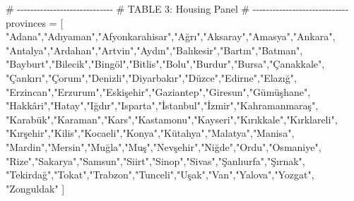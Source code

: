\documentclass[
  11pt,
  a4paper,
  DIV=11,
  numbers=noendperiod]{scrartcl}
\newenvironment{Shaded}{\begin{snugshade}}{\end{snugshade}}
\newcommand{\CommentTok}[1]{\textcolor[rgb]{0.37,0.37,0.37}{#1}}
\newcommand{\NormalTok}[1]{\textcolor[rgb]{0.00,0.23,0.31}{#1}}
\newcommand{\OperatorTok}[1]{\textcolor[rgb]{0.37,0.37,0.37}{#1}}
\newcommand{\StringTok}[1]{\textcolor[rgb]{0.13,0.47,0.30}{#1}}
\begin{document}
\begin{Shaded}
\begin{Highlighting}[]
\CommentTok{\# {-}{-}{-}{-}{-}{-}{-}{-}{-}{-}{-}{-}{-}{-}{-}{-}{-}{-}{-}{-}{-}{-}{-}{-}{-}{-}{-}{-}{-}}
\CommentTok{\# TABLE 3: Housing Panel}
\CommentTok{\# {-}{-}{-}{-}{-}{-}{-}{-}{-}{-}{-}{-}{-}{-}{-}{-}{-}{-}{-}{-}{-}{-}{-}{-}{-}{-}{-}{-}{-}}
\NormalTok{provinces }\OperatorTok{=}\NormalTok{ [}
    \StringTok{"Adana"}\NormalTok{,}\StringTok{"Adıyaman"}\NormalTok{,}\StringTok{"Afyonkarahisar"}\NormalTok{,}\StringTok{"Ağrı"}\NormalTok{,}\StringTok{"Aksaray"}\NormalTok{,}\StringTok{"Amasya"}\NormalTok{,}\StringTok{"Ankara"}\NormalTok{,}
    \StringTok{"Antalya"}\NormalTok{,}\StringTok{"Ardahan"}\NormalTok{,}\StringTok{"Artvin"}\NormalTok{,}\StringTok{"Aydın"}\NormalTok{,}\StringTok{"Balıkesir"}\NormalTok{,}\StringTok{"Bartın"}\NormalTok{,}\StringTok{"Batman"}\NormalTok{,}
    \StringTok{"Bayburt"}\NormalTok{,}\StringTok{"Bilecik"}\NormalTok{,}\StringTok{"Bingöl"}\NormalTok{,}\StringTok{"Bitlis"}\NormalTok{,}\StringTok{"Bolu"}\NormalTok{,}\StringTok{"Burdur"}\NormalTok{,}\StringTok{"Bursa"}\NormalTok{,}\StringTok{"Çanakkale"}\NormalTok{,}
    \StringTok{"Çankırı"}\NormalTok{,}\StringTok{"Çorum"}\NormalTok{,}\StringTok{"Denizli"}\NormalTok{,}\StringTok{"Diyarbakır"}\NormalTok{,}\StringTok{"Düzce"}\NormalTok{,}\StringTok{"Edirne"}\NormalTok{,}\StringTok{"Elazığ"}\NormalTok{,}
    \StringTok{"Erzincan"}\NormalTok{,}\StringTok{"Erzurum"}\NormalTok{,}\StringTok{"Eskişehir"}\NormalTok{,}\StringTok{"Gaziantep"}\NormalTok{,}\StringTok{"Giresun"}\NormalTok{,}\StringTok{"Gümüşhane"}\NormalTok{,}
    \StringTok{"Hakkâri"}\NormalTok{,}\StringTok{"Hatay"}\NormalTok{,}\StringTok{"Iğdır"}\NormalTok{,}\StringTok{"Isparta"}\NormalTok{,}\StringTok{"İstanbul"}\NormalTok{,}\StringTok{"İzmir"}\NormalTok{,}\StringTok{"Kahramanmaraş"}\NormalTok{,}
    \StringTok{"Karabük"}\NormalTok{,}\StringTok{"Karaman"}\NormalTok{,}\StringTok{"Kars"}\NormalTok{,}\StringTok{"Kastamonu"}\NormalTok{,}\StringTok{"Kayseri"}\NormalTok{,}\StringTok{"Kırıkkale"}\NormalTok{,}\StringTok{"Kırklareli"}\NormalTok{,}
    \StringTok{"Kırşehir"}\NormalTok{,}\StringTok{"Kilis"}\NormalTok{,}\StringTok{"Kocaeli"}\NormalTok{,}\StringTok{"Konya"}\NormalTok{,}\StringTok{"Kütahya"}\NormalTok{,}\StringTok{"Malatya"}\NormalTok{,}\StringTok{"Manisa"}\NormalTok{,}
    \StringTok{"Mardin"}\NormalTok{,}\StringTok{"Mersin"}\NormalTok{,}\StringTok{"Muğla"}\NormalTok{,}\StringTok{"Muş"}\NormalTok{,}\StringTok{"Nevşehir"}\NormalTok{,}\StringTok{"Niğde"}\NormalTok{,}\StringTok{"Ordu"}\NormalTok{,}\StringTok{"Osmaniye"}\NormalTok{,}
    \StringTok{"Rize"}\NormalTok{,}\StringTok{"Sakarya"}\NormalTok{,}\StringTok{"Samsun"}\NormalTok{,}\StringTok{"Siirt"}\NormalTok{,}\StringTok{"Sinop"}\NormalTok{,}\StringTok{"Sivas"}\NormalTok{,}\StringTok{"Şanlıurfa"}\NormalTok{,}\StringTok{"Şırnak"}\NormalTok{,}
    \StringTok{"Tekirdağ"}\NormalTok{,}\StringTok{"Tokat"}\NormalTok{,}\StringTok{"Trabzon"}\NormalTok{,}\StringTok{"Tunceli"}\NormalTok{,}\StringTok{"Uşak"}\NormalTok{,}\StringTok{"Van"}\NormalTok{,}\StringTok{"Yalova"}\NormalTok{,}\StringTok{"Yozgat"}\NormalTok{,}
    \StringTok{"Zonguldak"}
\NormalTok{]}


\end{Highlighting}
\end{Shaded}
\end{document}
